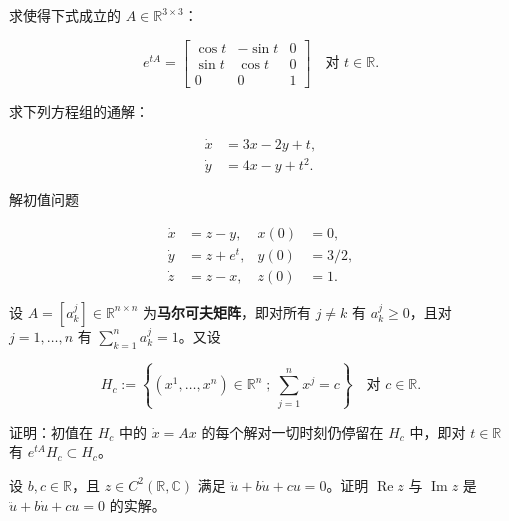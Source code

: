 \begin{exercises}
求使得下式成立的 $ A \in \mathbb{R}^{3 \times 3} $：

\begin{equation*}
e^{tA} = \begin{bmatrix} \cos t & -\sin t & 0 \\ \sin t & \cos t & 0 \\ 0 & 0 & 1 \end{bmatrix} \quad \text{对 } t \in \mathbb{R} .
\end{equation*}
\item

求下列方程组的通解：

\begin{equation*}
\begin{aligned}
\dot{x} &= 3x - 2y + t , \\ \dot{y} &= 4x - y + t^{2} .
\end{aligned}
\end{equation*}
\item

解初值问题

\begin{equation*}
\begin{aligned}
\dot{x} &= z - y , & x(0) &= 0 , \\ \dot{y} &= z + e^{t} , & y(0) &= 3/2 , \\ \dot{z} &= z - x , & z(0) &= 1 .
\end{aligned}
\end{equation*}
\item

设 $ A = [a_{k}^{j}] \in \mathbb{R}^{n \times n} $ 为\textbf{马尔可夫矩阵}，即对所有 $ j \ne k $ 有 $ a_{k}^{j} \ge 0 $，且对 $ j = 1, \ldots, n $ 有 $ \sum_{k=1}^{n} a_{k}^{j} = 1 $。又设

\[
H_c := \left\{ (x^{1}, \ldots, x^{n}) \in \mathbb{R}^{n} \;;\ \sum_{j=1}^{n} x^{j} = c \right\} \quad \text{对 } c \in \mathbb{R} .
\]

证明：初值在 $ H_c $ 中的 $ \dot{x} = Ax $ 的每个解对一切时刻仍停留在 $ H_c $ 中，即对 $ t \in \mathbb{R} $ 有 $ e^{tA}H_c \subset H_c $。

\item

设 $ b, c \in \mathbb{R} $，且 $ z \in C^{2}(\mathbb{R}, \mathbb{C}) $ 满足 $ \ddot{u} + b\dot{u} + cu = 0 $。证明 $ \operatorname{Re} z $ 与 $ \operatorname{Im} z $ 是 $ \ddot{u} + b\dot{u} + cu = 0 $ 的实解。

\item


\end{exercises}
